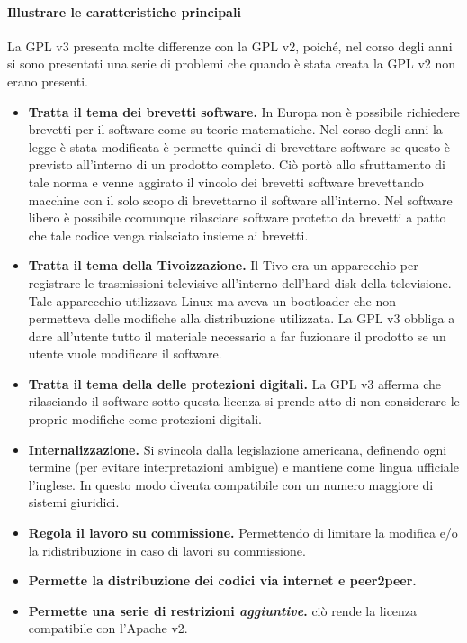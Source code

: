 \documentclass[a4paper]{article}
\begin{document}
			\paragraph{Illustrare le caratteristiche principali}
			La GPL v3 presenta molte differenze con la GPL v2, poiché, nel corso degli anni si sono presentati una serie di problemi che quando è stata creata la GPL v2 non erano presenti.
			\begin{itemize}
				\item \textbf{Tratta il tema dei brevetti software.} In Europa non è possibile richiedere brevetti per il software come su teorie matematiche. Nel corso degli anni la legge è stata modificata è permette quindi di brevettare software se questo è previsto all'interno di un prodotto completo. Ciò portò allo sfruttamento di tale norma e venne aggirato il vincolo dei brevetti software brevettando macchine con il solo scopo di brevettarno il software all'interno. Nel software libero è possibile ccomunque rilasciare software protetto da brevetti a patto che tale codice venga rialsciato insieme ai brevetti.
				\item \textbf{Tratta il tema della Tivoizzazione.} Il Tivo era un apparecchio per registrare le trasmissioni televisive all'interno dell'hard disk della televisione. Tale apparecchio utilizzava Linux ma aveva un bootloader che non permetteva delle modifiche alla distribuzione utilizzata. La GPL v3 obbliga a dare all'utente tutto il materiale necessario a far fuzionare il prodotto se un utente vuole modificare il software.
				\item \textbf{Tratta il tema della delle protezioni digitali.} La GPL v3 afferma che rilasciando il software sotto questa licenza si prende atto di non considerare le proprie modifiche come protezioni digitali.
				\item \textbf{Internalizzazione.} Si svincola dalla legislazione americana, definendo ogni termine (per evitare interpretazioni ambigue) e mantiene come lingua ufficiale l'inglese. In questo modo diventa compatibile con un numero maggiore di sistemi giuridici.
				\item \textbf{Regola il lavoro su commissione.} Permettendo di limitare la modifica e/o la ridistribuzione in caso di lavori su commissione.
				\item \textbf{Permette la distribuzione dei codici via internet e peer2peer.}
				\item \textbf{Permette una serie di restrizioni \emph{aggiuntive}.} ciò rende la licenza compatibile con l'Apache v2.

			\end{itemize}
		
\end{document}

